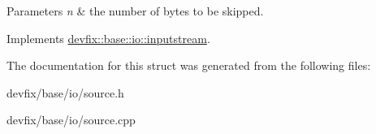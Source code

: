 \begin{DoxyParams}{Parameters}
{\em n} & the number of bytes to be skipped. \\
\hline
\end{DoxyParams}


Implements \hyperlink{structdevfix_1_1base_1_1io_1_1inputstream_a1868a733fd646b29daae6874e07e4e03}{devfix\+::base\+::io\+::inputstream}.



The documentation for this struct was generated from the following files\+:\begin{DoxyCompactItemize}
\item 
devfix/base/io/source.\+h\item 
devfix/base/io/source.\+cpp\end{DoxyCompactItemize}
